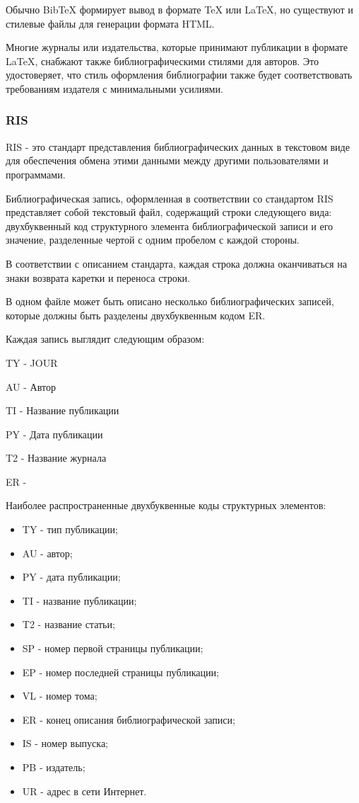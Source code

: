 Обычно BibTeX формирует вывод в формате TeX или LaTeX, но существуют и стилевые файлы для генерации формата HTML.

Многие журналы или издательства, которые принимают публикации в формате LaTeX, снабжают также библиографическими стилями для авторов. Это удостоверяет, что стиль оформления библиографии также будет соответствовать требованиям издателя с минимальными усилиями.

\subsubsection*{RIS}

RIS - это стандарт представления библиографических данных в текстовом виде для обеспечения обмена этими данными между другими пользователями и программами.

Библиографическая запись, оформленная в соответствии со стандартом RIS представляет собой текстовый файл, содержащий строки следующего вида: двухбуквенный код структурного элемента библиографической записи и его значение, разделенные чертой с одним пробелом с каждой стороны.

В соответствии с описанием стандарта, каждая строка должна оканчиваться на знаки возврата каретки и переноса строки.

В одном файле может быть описано несколько библиографических записей, которые должны быть разделены двухбуквенным кодом ER.

Каждая запись выглядит следующим образом:

TY - JOUR \par
AU - Автор \par
TI - Название публикации \par
PY - Дата публикации \par
T2 - Название журнала \par
ER - 

Наиболее распространенные двухбуквенные коды структурных элементов:

\begin{itemize}
	\item TY - тип публикации;
	\item AU - автор;
	\item PY - дата публикации;
	\item TI - название публикации;
	\item T2 - название статьи;
	\item SP - номер первой страницы публикации;
	\item EP - номер последней страницы публикации;
	\item VL - номер тома;
	\item ER - конец описания библиографической записи;
	\item IS - номер выпуска;
	\item PB - издатель;
	\item UR - адрес в сети Интернет.
\end{itemize}

